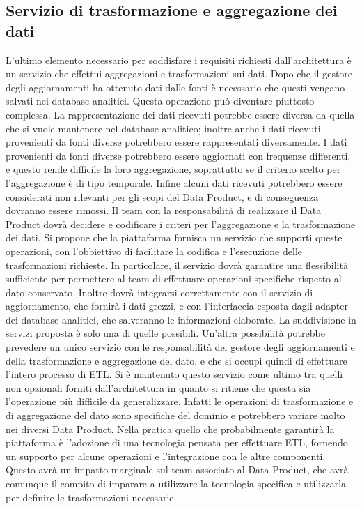 \documentclass[12pt]{report}
\begin{document}
\subsection{Servizio di trasformazione e aggregazione dei dati}
L'ultimo elemento necessario per soddisfare i requisiti richiesti dall'architettura è un servizio che effettui aggregazioni e trasformazioni sui dati.
Dopo che il gestore degli aggiornamenti ha ottenuto dati dalle fonti è necessario che questi vengano salvati nei database analitici.
Questa operazione può diventare piuttosto complessa.
La rappresentazione dei dati ricevuti potrebbe essere diversa da quella che si vuole mantenere nel database analitico; inoltre anche i dati ricevuti provenienti da fonti diverse potrebbero essere rappresentati diversamente.
I dati provenienti da fonti diverse potrebbero essere aggiornati con frequenze differenti, e questo rende difficile la loro aggregazione, soprattutto se il criterio scelto per l'aggregazione è di tipo temporale.
Infine alcuni dati ricevuti potrebbero essere considerati non rilevanti per gli scopi del Data Product, e di conseguenza dovranno essere rimossi.
Il team con la responsabilità di realizzare il Data Product dovrà decidere e codificare i criteri per l'aggregazione e la trasformazione dei dati.
Si propone che la piattaforma fornisca un servizio che supporti queste operazioni, con l'obbiettivo di facilitare la codifica e l'esecuzione delle trasformazioni richieste.
In particolare, il servizio dovrà garantire una flessibilità sufficiente per permettere al team di effettuare operazioni specifiche rispetto al dato conservato.
Inoltre dovrà integrarsi correttamente con il servizio di aggiornamento, che fornirà i dati grezzi, e con l'interfaccia esposta dagli adapter dei database analitici, che salveranno le informazioni elaborate.
La suddivisione in servizi proposta è solo una di quelle possibili. 
Un'altra possibilità potrebbe prevedere un unico servizio con le responsabilità del gestore degli aggiornamenti e della  trasformazione e aggregazione del dato, e che si occupi quindi di effettuare l'intero processo di ETL.
Si è mantenuto questo servizio come ultimo tra quelli non opzionali forniti dall'architettura in quanto si ritiene che questa sia l'operazione più difficile da generalizzare.
Infatti le operazioni di trasformazione e di aggregazione del dato sono specifiche del dominio e potrebbero variare molto nei diversi Data Product.
Nella pratica quello che probabilmente garantirà la piattaforma è l'adozione di una tecnologia pensata per effettuare ETL, fornendo un supporto per alcune operazioni e l'integrazione con le altre componenti.
Questo avrà un impatto marginale sul team associato al Data Product, che avrà comunque il compito di imparare a utilizzare la tecnologia specifica e utilizzarla per definire le trasformazioni necessarie.
\end{document}
